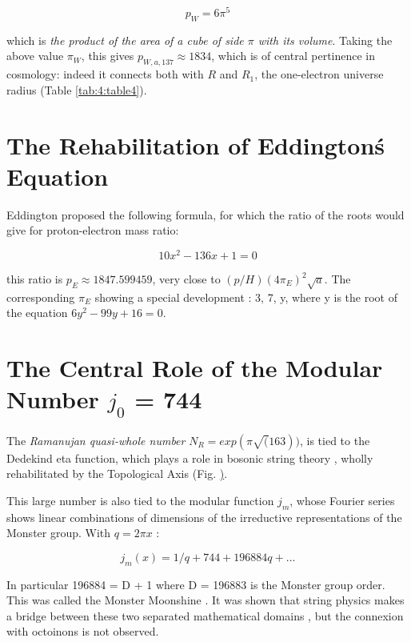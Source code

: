 \documentclass[a4paper,9pt]{article}
\begin{document}
\begin{equation}
 p_W = 6\pi^5    
\end{equation}

which is \textit {the product of the area of a cube of side $\pi$ with its volume}. Taking the above value $\pi_W$, this gives $p_{W, a, 137} \approx 1834$, which is of central pertinence in cosmology: indeed it connects both with $R$ and $R_1$, the one-electron universe radius \cite{Sanchez} (Table \ref{tab:4:table4}).

\section{The Rehabilitation of Eddington\'s Equation}
Eddington proposed the following formula, for which the ratio of the roots would give for proton-electron mass ratio:

\begin{equation}
 10x^2 - 136x +1 = 0     
\end{equation}

this ratio is $p_E \approx 1847.599459$, very close to $(p/H)(4\pi_E)^2\sqrt a$. The corresponding $\pi_E$ showing a special development : 3, 7, y, where y is the root of the equation $6y^2 - 99 y + 16 = 0$. 

\section{The Central Role of the Modular Number $j_0$ = 744}

The \textit{Ramanujan quasi-whole number} $N_R = exp(\pi\sqrt(163))$, is tied to the Dedekind eta function, which plays a role in bosonic string theory \cite{Apostol}\cite{Lovelace}, wholly rehabilitated by the Topological Axis (Fig. \href{fig:7:fig1}).


This large number is also tied to the modular function $j_m$, whose Fourier series shows linear combinations of dimensions of the irreductive representations of the Monster group. With $q = 2\pi x$ :

\begin{equation}
j_m(x) = 1/q + 744 + 196884 q + ...
\end{equation}

In particular 196884 = D + 1 where D = 196883 is the Monster group order. This was called the Monster Moonshine \cite{Conway}. It was shown that string physics makes a bridge between these two separated mathematical domains \cite{Borcherds}, but the connexion with octoinons is not observed. 
\end{document}
